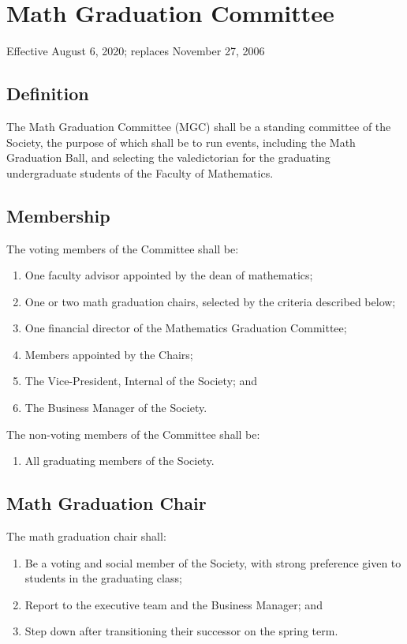 \section{Math Graduation Committee}
Effective August 6, 2020; replaces November 27, 2006

\subsection{Definition}
The Math Graduation Committee (MGC) shall be a standing committee of the Society, the 
purpose of which shall be to run events, including the Math Graduation Ball, and 
selecting the valedictorian for the graduating undergraduate students of the Faculty 
of Mathematics.

\subsection{Membership}
The voting members of the Committee shall be:
\begin{enumerate}
\item One faculty advisor appointed by the dean of mathematics;
\item One or two math graduation chairs, selected by the criteria described below;
\item One financial director of the Mathematics Graduation Committee;
\item Members appointed by the Chairs;
\item The Vice-President, Internal of the Society; and 
\item The Business Manager of the Society.
\end{enumerate}
The non-voting members of the Committee shall be:
\begin{enumerate}
\item All graduating members of the Society.
\end{enumerate}

\subsection{Math Graduation Chair}
The math graduation chair shall:
\begin{enumerate}
\item Be a voting and social member of the Society, with strong preference given to students in the graduating class;
\item Report to the executive team and the Business Manager; and 
\item Step down after transitioning their successor on the spring term.
\end{enumerate}

